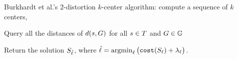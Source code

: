 \begin{algorithm}[t]
\SetAlgoNoEnd
    \caption{A $3$-distortion algorithm}
    \label{alg:conventional-fair-k-center}
    \SetAlgoLined
    Burkhardt et al.'s $2$-distortion $k$-center algorithm: compute a sequence of $k$ centers, \InitSolSet \label{alg:cov:burkhardt}

    Query all the distances of $d(s, G)$ for all $s \in T$ and $G \in \mathbb{G}$


    Return the solution $S_{\tilde{\ell}}$, where $\tilde{\ell} = \mathop{\mathrm{argmin}}_{\ell} \big(\texttt{cost}(S_{\ell}) + \lambda_{\ell}\big)$. 
\end{algorithm}
